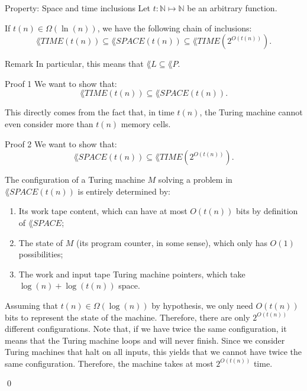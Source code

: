 \documentclass[a4paper]{article}
\begin{document}
\begin{parag}{Property: Space and time inclusions}
    Let $t: \mathbb{N} \mapsto \mathbb{N}$ be an arbitrary function.

    If $t\left(n\right) \in \Omega\left(\ln\left(n\right)\right)$, we have the following chain of inclusions:
    \[\lang{TIME}\left(t\left(n\right)\right) \subseteq \lang{SPACE}\left(t\left(n\right)\right) \subseteq \lang{TIME}\left(2^{O\left(t\left(n\right)\right)}\right).\]

    \begin{subparag}{Remark}
        In particular, this means that $\lang{L} \subseteq \lang{P}$.
    \end{subparag}

    \begin{subparag}{Proof 1}
        We want to show that: 
        \[\lang{TIME}\left(t\left(n\right)\right) \subseteq \lang{SPACE}\left(t\left(n\right)\right).\]
        
        This directly comes from the fact that, in time $t\left(n\right)$, the Turing machine cannot even consider more than $t\left(n\right)$ memory cells.
    \end{subparag}

    \begin{subparag}{Proof 2}
        We want to show that:
        \[\lang{SPACE}\left(t\left(n\right)\right) \subseteq \lang{TIME}\left(2^{O\left(t\left(n\right)\right)}\right).\]

        The configuration of a Turing machine $M$ solving a problem in $\lang{SPACE}\left(t\left(n\right)\right)$ is entirely determined by:
        \begin{enumerate}
            \item Its work tape content, which can have at most $O\left(t\left(n\right)\right)$ bits by definition of $\lang{SPACE}$;
            \item The state of $M$ (its program counter, in some sense), which only has $O\left(1\right)$ possibilities;
            \item The work and input tape Turing machine pointers, which take $\log\left(n\right) + \log\left(t\left(n\right)\right)$ space.
        \end{enumerate}

        Assuming that $t\left(n\right) \in \Omega\left(\log\left(n\right)\right)$ by hypothesis, we only need $O\left(t\left(n\right)\right)$ bits to represent the state of the machine. Therefore, there are only $2^{O\left(t\left(n\right)\right)}$ different configurations. Note that, if we have twice the same configuration, it means that the Turing machine loops and will never finish. Since we consider Turing machines that halt on all inputs, this yields that we cannot have twice the same configuration. Therefore, the machine takes at most $2^{O\left(t\left(n\right)\right)}$ time.

        \qed
    \end{subparag}
\end{parag}
\end{document}
